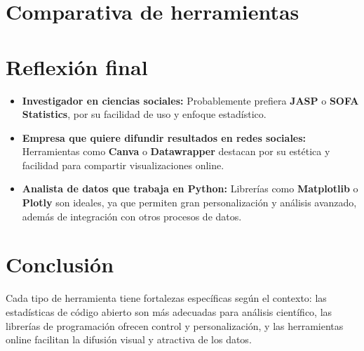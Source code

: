 \documentclass{../../miPlantilla}
\begin{document}
\newpage




\section{Comparativa de herramientas}



\section{Reflexión final}

\begin{itemize}
    \item \textbf{Investigador en ciencias sociales:} Probablemente prefiera \textbf{JASP} o \textbf{SOFA Statistics}, por su facilidad de uso y enfoque estadístico.
    \item \textbf{Empresa que quiere difundir resultados en redes sociales:} Herramientas como \textbf{Canva} o \textbf{Datawrapper} destacan por su estética y facilidad para compartir visualizaciones online.
    \item \textbf{Analista de datos que trabaja en Python:} Librerías como \textbf{Matplotlib} o \textbf{Plotly} son ideales, ya que permiten gran personalización y análisis avanzado, además de integración con otros procesos de datos.
\end{itemize}

\section{Conclusión}
Cada tipo de herramienta tiene fortalezas específicas según el contexto: las estadísticas de código abierto son más adecuadas para análisis científico, las librerías de programación ofrecen control y personalización, y las herramientas online facilitan la difusión visual y atractiva de los datos.
\end{document}
